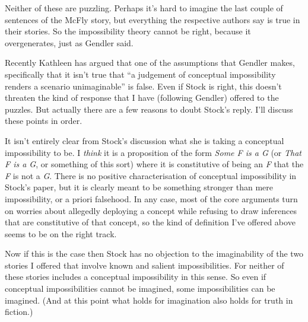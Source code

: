 \noindent Neither of these are puzzling. Perhaps it's hard to imagine the last couple of sentences of the McFly story, but everything the respective authors say is true in their stories. So the impossibility theory cannot be right, because it overgenerates, just as Gendler said.

Recently Kathleen \citet{Stock2003} has argued that one of the assumptions that Gendler makes, specifically that it isn't true that ``a judgement of conceptual impossibility renders a scenario unimaginable'' \citep[66]{Gendler2000} is false. Even if Stock is right, this doesn't threaten the kind of response that I have (following Gendler) offered to the puzzles. But actually there are a few reasons to doubt Stock's reply. I'll discuss these points in order.

It isn't entirely clear from Stock's discussion what she is taking a conceptual impossibility to be. I \textit{think} it is a proposition of the form \textit{Some F is a G} (or \textit{That F is a G}, or something of this sort) where it is constitutive of being an \textit{F} that the \textit{F} is not a \textit{G}. There is no positive characterisation of conceptual impossibility in Stock's paper, but it is clearly meant to be something stronger than mere impossibility, or a priori falsehood. In any case, most of the core arguments turn on worries about allegedly deploying a concept while refusing to draw inferences that are constitutive of that concept, so the kind of definition I've offered above seems to be on the right track.

Now if this is the case then Stock has no objection to the imaginability of the two stories I offered that involve known and salient impossibilities. For neither of these stories includes a conceptual impossibility in this sense. So even if conceptual impossibilities cannot be imagined, some impossibilities can be imagined. (And at this point what holds for imagination also holds for truth in fiction.)

